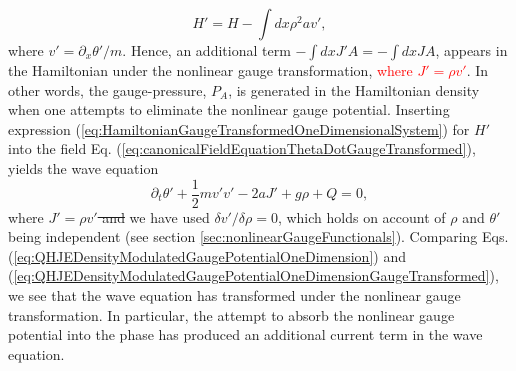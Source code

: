 \documentclass[twocolumn, nofootinbib, nobibnotes, amsmath,amssymb,aps, pra, floatfix]{revtex4-1}
\begin{document}
\begin{equation}
  H'=H-\int dx\rho^2 a v',
  \label{eq:HamiltonianGaugeTransformedOneDimensionalSystem}
\end{equation}
where $v'=\partial_x\theta'/m$.
Hence, an additional term $-\int dx J' A=-\int dx J A$, appears in the Hamiltonian under the nonlinear gauge transformation, \textcolor{red}{where $J'=\rho v'$}.
In other words, the gauge-pressure, $P_A$, is generated in the Hamiltonian density when one attempts to eliminate the nonlinear gauge potential.
Inserting expression (\ref{eq:HamiltonianGaugeTransformedOneDimensionalSystem}) for $H'$ into the field Eq. (\ref{eq:canonicalFieldEquationThetaDotGaugeTransformed}), yields the wave equation
\begin{equation}
  \partial_t\theta'+\frac{1}{2}m v'v'-2a J'+g\rho+Q=0,
  \label{eq:QHJEDensityModulatedGaugePotentialOneDimensionGaugeTransformed}
\end{equation}
where \sout{$J'=\rho v'$ and} we have used $\delta v'/\delta\rho=0$, which holds on account of $\rho$ and $\theta'$ being independent (see section \ref{sec:nonlinearGaugeFunctionals}).
Comparing Eqs. (\ref{eq:QHJEDensityModulatedGaugePotentialOneDimension}) and (\ref{eq:QHJEDensityModulatedGaugePotentialOneDimensionGaugeTransformed}), we see that the wave equation has transformed under the nonlinear gauge transformation.
In particular, the attempt to absorb the nonlinear gauge potential into the phase has produced an additional current term in the wave equation.
\end{document}
